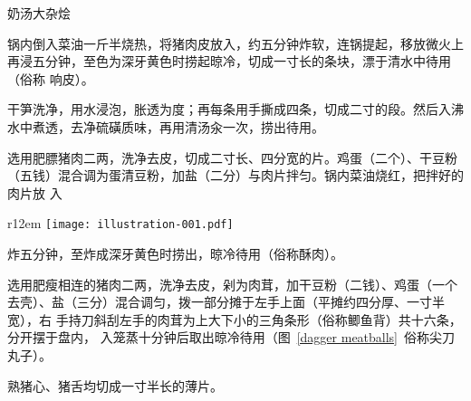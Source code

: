 \begin{recipe}{奶汤大杂烩}

\ingredients


\preparation

\step 锅内倒入菜油一斤半烧热，将猪肉皮放入，约五分钟炸软，连锅提起，移放微火上
再浸五分钟，至色为深牙黄色时捞起晾冷，切成一寸长的条块，漂于清水中待用（俗称
响皮）。

\step 干笋洗净，用水浸泡，胀透为度；再每条用手撕成四条，切成二寸的段。然后入沸
水中煮透，去净硫磺质味，再用清汤汆一次，捞出待用。

\step 选用肥膘猪肉二两，洗净去皮，切成二寸长、四分宽的片。鸡蛋（二个）、干豆粉
（五钱）混合调为蛋清豆粉，加盐（二分）与肉片拌匀。锅内菜油烧红，把拌好的肉片放
入
\begin{wrapfigure}[9]{r}{12em}%
\centering%
\vspace{.3125\baselineskip}%
\quad\texttt{[image: illustration-001.pdf]}%
\vspace{-.1875\baselineskip}%
\caption{尖刀丸子作法}
\label{dagger meatballs}
\end{wrapfigure}%
%
炸五分钟，至炸成深牙黄色时捞出，晾冷待用（俗称酥肉）。

\step 选用肥瘦相连的猪肉二两，洗净去皮，剁为肉茸，加干豆粉（二钱）、鸡蛋（一个
去壳）、盐（三分）混合调匀，拨一部分摊于左手上面（平摊约四分厚、一寸半宽），右
手持刀斜刮左手的肉茸为上大下小的三角条形（俗称鲫鱼背）共十六条，分开摆于盘内，
入笼蒸十分钟后取出晾冷待用（图~\ref{dagger meatballs}~俗称尖刀丸子）。

\step 熟猪心、猪舌均切成一寸半长的薄片。


\end{recipe}

